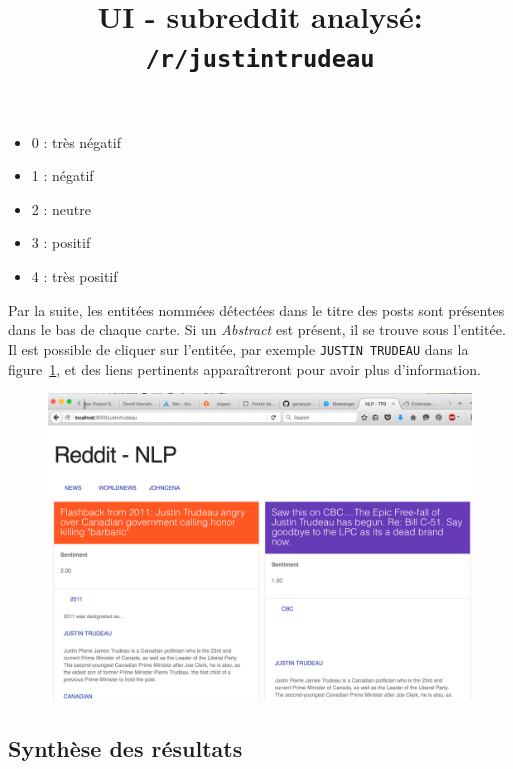 \documentclass[12pt]{article}
\begin{document}
\begin{itemize}
\item 0 : très négatif
\item 1 : négatif
\item 2 : neutre
\item 3 : positif
\item 4 : très positif
\\
\end{itemize}

Par la suite, les entitées nommées détectées dans le titre des posts sont présentes dans le bas de chaque carte. Si un \textit{Abstract} est présent, il se trouve sous l'entitée. Il est possible de cliquer sur l'entitée, par exemple \verb;JUSTIN TRUDEAU; dans la figure~\ref{fig:ui-example}, et des liens pertinents apparaîtreront pour avoir plus d'information.

\begin{figure}[H]
  \begin{center}
    \title{UI - subreddit analysé: \verb;/r/justintrudeau;}
  \end{center}
  \includegraphics[width=18cm]{fig/ui-example.png}
  \label{fig:ui-example}
\end{figure}

\subsection{Synthèse des résultats}
\end{document}
